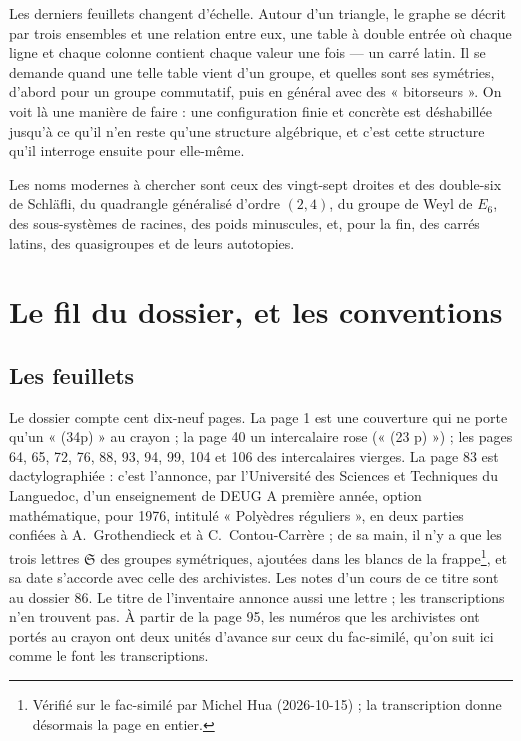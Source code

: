 \documentclass[11pt,a4paper]{article}
\begin{document}
\begin{resume}
Les derniers feuillets changent d'échelle. Autour d'un triangle, le graphe se
décrit par trois ensembles et une relation entre eux, une table à double
entrée où chaque ligne et chaque colonne contient chaque valeur une fois --- un
carré latin. Il se demande quand une telle table vient d'un groupe, et quelles
sont ses symétries, d'abord pour un groupe commutatif, puis en général avec des
« bitorseurs ». On voit là une manière de faire : une configuration finie et
concrète est déshabillée jusqu'à ce qu'il n'en reste qu'une structure
algébrique, et c'est cette structure qu'il interroge ensuite pour elle-même.

Les noms modernes à chercher sont ceux des vingt-sept droites et des
double-six de Schläfli, du quadrangle généralisé d'ordre $(2,4)$, du groupe de
Weyl de $E_6$, des sous-systèmes de racines, des poids minuscules, et, pour la
fin, des carrés latins, des quasigroupes et de leurs autotopies.

\end{resume}

\section*{Le fil du dossier, et les conventions}

\subsection*{Les feuillets}

Le dossier compte cent dix-neuf pages. La page 1 est une couverture qui ne
porte qu'un « (34p) » au crayon ; la page 40 un intercalaire rose
(« (23 p) ») ; les pages 64, 65, 72, 76, 88, 93, 94, 99, 104 et 106 des
intercalaires vierges. La page 83 est dactylographiée : c'est l'annonce, par
l'Université des Sciences et Techniques du Languedoc, d'un enseignement de
DEUG A première année, option mathématique, pour 1976, intitulé
« Polyèdres réguliers », en deux parties confiées à A.~Grothendieck et à
C.~Contou-Carrère ; de sa main, il n'y a que les trois lettres $\mathfrak{S}$
des groupes symétriques, ajoutées dans les blancs de la frappe\footnote{Vérifié
sur le fac-similé par Michel Hua (2026-10-15) ; la transcription donne
désormais la page en entier.}, et sa date s'accorde avec celle
des archivistes. Les notes d'un cours de ce titre sont au dossier 86. Le
titre de l'inventaire annonce aussi une lettre ; les transcriptions n'en
trouvent pas. À partir de la page 95, les numéros que les archivistes ont
portés au crayon ont deux unités d'avance sur ceux du fac-similé, qu'on suit
ici comme le font les transcriptions.
\end{document}
